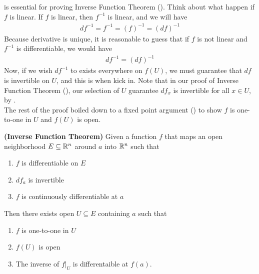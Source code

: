\documentclass{report}
\begin{document}
\begin{mdframed}
 is essential for proving Inverse Function Theorem (). Think about what happen if $f$ is linear. If $f$ is linear, then $f^{-1}$ is linear, and we will have 
\begin{align*}
df^{-1}=f^{-1}=(f)^{-1}=(df)^{-1}
\end{align*}
Because derivative is unique, it is reasonable to guess that if $f$ is not linear and $f^{-1}$ is differentiable, we would have 
\begin{align*}
df^{-1}=(df)^{-1}
\end{align*}
Now, if we wish $df^{-1}$ to exists everywhere on $f(U)$, we must guarantee that $df$ is invertible on  $U$, and this is when  kick in. Note that in our proof of Inverse Function Theorem (), our selection of $U$ guarantee  $df_x$ is invertible for all $x \in U$, by .\\

The rest of the proof boiled down to a fixed point argument  () to show $f$ is one-to-one in $U$ and $f(U)$ is open. 
\end{mdframed}
\begin{theorem}
\label{IFT}
\textbf{(Inverse Function Theorem)} Given a function $f$ that maps an open neighborhood $E\subseteq \mathbb{R}^n$ around $a$  into $\mathbb{R}^n$ such that 
\begin{enumerate}[label=(\alph*)]
  \item $f$ is differentiable on $E$  
  \item $df_a$ is invertible 
   \item $f$ is continuously differentiable at  $a$
\end{enumerate}
Then there exists open $U \subseteq E$ containing $a$ such that
\begin{enumerate}[label=(\alph*)]
  \item $f$ is one-to-one in $U$
   \item $f(U)$ is open 
    \item The inverse of $f|_U$ is differentaible at $f(a)$. 
\end{enumerate}
\end{theorem}
\end{document}
